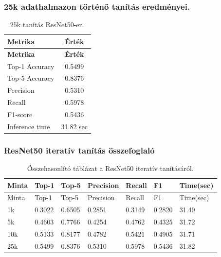 \subsubsection{25k adathalmazon történő tanítás eredményei.}
  \begin{center}
    \begin{longtable}{l c}
    \caption{25k tanítás ResNet50-en.} \label{tab:phase03_ResNet50_25k} \\
    \toprule
    \textbf{Metrika} & \textbf{Érték} \\
    \midrule
    \endfirsthead
    \toprule
    \textbf{Metrika} & \textbf{Érték} \\
    \midrule
    \endhead
    Top-1 Accuracy & 0.5499 \\
    Top-5 Accuracy & 0.8376 \\
    Precision      & 0.5310 \\
    Recall         & 0.5978 \\
    F1-score       & 0.5436 \\
    Inference time & 31.82 sec \\
    \bottomrule
    \end{longtable}
  \end{center}

\subsubsection{ResNet50 iteratív tanítás összefoglaló}
  \begin{center}
    \begin{longtable}{lllllll}
    \caption{Összehasonlító táblázat a ResNet50 iteratív tanításáról.}\label{tab:phase3_ResNet50_summary_table}\\
    \toprule
    Minta & Top-1 & Top-5 & Precision & Recall & F1 & Time(sec) \\
    \midrule
    \endfirsthead
    \toprule
    Minta & Top-1 & Top-5 & Precision & Recall & F1 & Time(sec) \\
    \midrule
    \endhead
    1k & 0.3022 & 0.6505 & 0.2851 & 0.3149 & 0.2820 & 31.49 \\
    5k & 0.4603 & 0.7766 & 0.4254 & 0.4762 & 0.4325 & 31.72 \\
    10k & 0.5133 & 0.8177 & 0.4782 & 0.5421 & 0.4905 & 31.71 \\
    25k & 0.5499 & 0.8376 & 0.5310 & 0.5978 & 0.5436 & 31.82 \\
    \bottomrule
    \end{longtable}
  \end{center}

